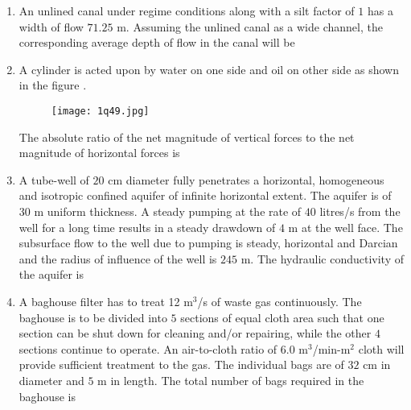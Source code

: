 \documentclass[journal,12pt,onecolumn]{article}
\theoremstyle{remark}
\begin{document}
\begin{enumerate}
\hfill{}

\item An unlined canal under regime conditions along with a silt factor of $1$ has a width of flow $71.25$ m. Assuming the unlined canal as a wide channel, the corresponding average depth of flow  in the canal will be \underline{\hspace{2cm}}

\hfill{}

\item A cylinder  is acted upon by water on one side and oil  on other side as shown in the figure .
\begin{figure}[H]
    \centering
    \texttt{[image: 1q49.jpg]}
    \caption{}
    \label{fig:q49}
\end{figure}
The absolute ratio of the net magnitude of vertical forces to the net magnitude of horizontal forces  is \underline{\hspace{2cm}}

\hfill{}

\item A tube-well of $20$ cm diameter fully penetrates a horizontal, homogeneous and isotropic confined aquifer of infinite horizontal extent. The aquifer is of $30$ m uniform thickness. A steady pumping at the rate of $40$ litres/s from the well for a long time results in a steady drawdown of $4$ m at the well face. The subsurface flow to the well due to pumping is steady, horizontal and Darcian and the radius of influence of the well is $245$ m. The hydraulic conductivity of the aquifer  is \underline{\hspace{2cm}}

\hfill{}

\item A baghouse filter has to treat 12 m$^3$/s of waste gas continuously. The baghouse is to be divided into $5$ sections of equal cloth area such that one section can be shut down for cleaning and/or repairing, while the other $4$ sections continue to operate. An air-to-cloth ratio of 6.0 m$^3$/min-m$^2$ cloth will provide sufficient treatment to the gas. The individual bags are of $32$ cm in diameter and $5$ m in length. The total number of bags  required in the baghouse is \underline{\hspace{2cm}}


\end{enumerate}
\end{document}
